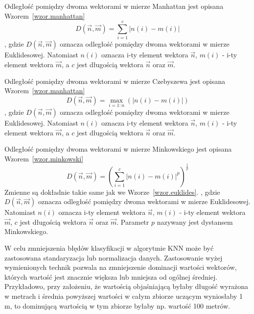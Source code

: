 \documentclass[a4paper,twoside,12pt]{book}
\begin{document}
    Odległość pomiędzy dwoma wektorami w mierze Manhattan jest opisana Wzorem~\ref{wzor.manhattan}
    \large
    \begin{equation}
        D(\overrightarrow{n},\overrightarrow{m})=\sum_{i=1}^{c}\left |n(i)-m(i)\right |
        \label{wzor.manhattan}
    \end{equation}
    \normalsize
    , gdzie $D(\overrightarrow{n},\overrightarrow{m})$ oznacza odległość pomiędzy dwoma wektorami w mierze Euklidesowej.
    Natomiast $n(i)$ oznacza i-ty element wektora $\overrightarrow{n}$,  $m(i)$ - i-ty element wektora
    $\overrightarrow{m}$, a $c$ jest długością wektora  $\overrightarrow{n}$ oraz $\overrightarrow{m}$.

    Odległość pomiędzy dwoma wektorami w mierze Czebyszewa jest opisana Wzorem~\ref{wzor.manhattan}
    \large
    \begin{equation}
        D(\overrightarrow{n},\overrightarrow{m})=\max_{i=1:n}( \left |n(i)-m(i) \right |)
        \label{wzor.czebyszew}
    \end{equation}
    \normalsize
    , gdzie $D(\overrightarrow{n},\overrightarrow{m})$ oznacza odległość pomiędzy dwoma wektorami w mierze Euklidesowej.
    Natomiast $n(i)$ oznacza i-ty element wektora $\overrightarrow{n}$,  $m(i)$ - i-ty element wektora
    $\overrightarrow{m}$, a $c$ jest długością wektora  $\overrightarrow{n}$ oraz $\overrightarrow{m}$.

    Odległość pomiędzy dwoma wektorami w mierze Minkowskiego jest opisana Wzorem~\ref{wzor.minkowski}
    \large
    \begin{equation}
        D(\overrightarrow{n},\overrightarrow{m})=(\sum_{i=1}^{c} \left |n(i)-m(i) \right |^{p})^{\frac{1}{p}}
        \label{wzor.minkowski}
    \end{equation}
    \normalsize
    Zmienne są dokładnie takie same jak we Wzorze~\ref{wzor.euklides}.
    , gdzie $D(\overrightarrow{n},\overrightarrow{m})$ oznacza odległość pomiędzy dwoma wektorami w mierze Euklidesowej.
    Natomiast $n(i)$ oznacza i-ty element wektora $\overrightarrow{n}$,  $m(i)$ - i-ty element wektora
    $\overrightarrow{m}$, $c$ jest długością wektora $\overrightarrow{n}$ oraz $\overrightarrow{m}$.
    Parametr $p$ nazywany jest dystansem Minkowskiego.

    W celu zmniejszenia błędów klasyfikacji w algorytmie KNN może być zastosowana standaryzacja lub normalizacja danych.
    Zastosowanie wyżej wymienionych technik pozwala na zmniejszenie dominacji wartości wektorów, których wartość jest
    znacznie większa lub mniejsza od ogólnej średniej. Przykładowo, przy założeniu, że
    wartością objaśniającą byłaby długość wyrażona w metrach i średnia powyższej wartości w całym zbiorze uczącym
    wyniosłaby 1 m,
    to dominującą wartością w tym zbiorze byłaby np. wartość 100 metrów.
\end{document}
